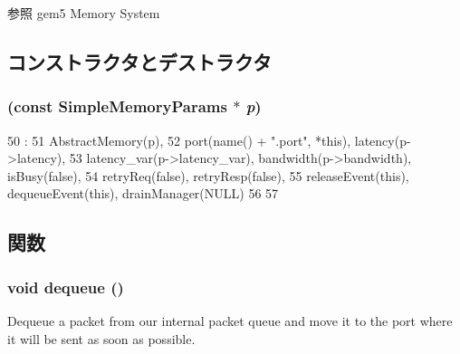 \begin{DoxySeeAlso}{参照}
gem5 Memory System 
\end{DoxySeeAlso}


\subsection{コンストラクタとデストラクタ}
\hypertarget{classSimpleMemory_afc0d41f7c9b61cc5161f7f4b10a1b942}{
\subsubsection[{SimpleMemory}]{ (const SimpleMemoryParams $\ast$ {\em p})}}
\label{classSimpleMemory_afc0d41f7c9b61cc5161f7f4b10a1b942}



\begin{DoxyCode}
50                                                       :
51     AbstractMemory(p),
52     port(name() + ".port", *this), latency(p->latency),
53     latency_var(p->latency_var), bandwidth(p->bandwidth), isBusy(false),
54     retryReq(false), retryResp(false),
55     releaseEvent(this), dequeueEvent(this), drainManager(NULL)
56 {
57 }

\end{DoxyCode}


\subsection{関数}
\hypertarget{classSimpleMemory_a851b6644e3e336c07f8e6fe77234b97f}{
\subsubsection[{dequeue}]{\setlength{\rightskip}{0pt plus 5cm}void dequeue ()}}
\label{classSimpleMemory_a851b6644e3e336c07f8e6fe77234b97f}
Dequeue a packet from our internal packet queue and move it to the port where it will be sent as soon as possible. 


